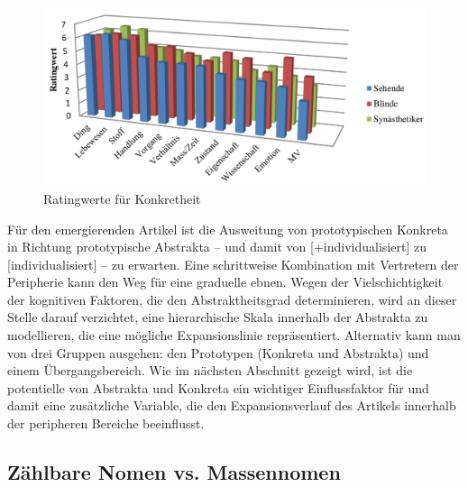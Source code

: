 \begin{figure}
\begin{center}
\includegraphics[width=12cm]{images/rating-konkret-abstrakt-schrauf-neu.jpg}
\caption {Ratingwerte für Konkretheit \parencite[Darstellung aus][162]{Schrauf2011}}
\label{abb:schrauf-rating}
\end{center}
\end{figure}

Für den emergierenden Artikel ist die Ausweitung von prototypischen  Konkreta in Richtung prototypische  Abstrakta -- und damit von [+individualisiert] zu [\textminus{}individualisiert] -- zu erwarten. Eine schrittweise Kombination mit Vertretern der Peripherie kann den Weg für eine graduelle  ebnen. Wegen der Vielschichtigkeit der kognitiven Faktoren, die den Abstraktheitsgrad determinieren, wird an dieser Stelle darauf verzichtet, eine hierarchische Skala innerhalb der  Abstrakta  zu modellieren, die eine mögliche Expansionslinie  repräsentiert. Alternativ kann man von drei Gruppen ausgehen: den Prototypen (Konkreta  und  Abstrakta) und einem Übergangsbereich. Wie im nächsten Abschnitt gezeigt wird, ist die potentielle  von Abstrakta  und Konkreta  ein wichtiger Einflussfaktor für   und damit eine zusätzliche Variable, die den Expansionsverlauf  des Artikels innerhalb der peripheren Bereiche beeinflusst.  

\subsection{Zählbare Nomen vs. Massennomen}\label{section:mass}

